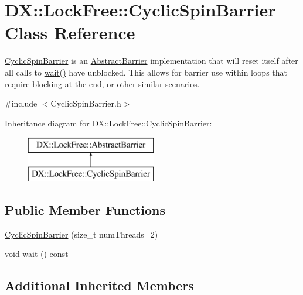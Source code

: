 \hypertarget{class_d_x_1_1_lock_free_1_1_cyclic_spin_barrier}{\section{D\-X\-:\-:Lock\-Free\-:\-:Cyclic\-Spin\-Barrier Class Reference}
\label{class_d_x_1_1_lock_free_1_1_cyclic_spin_barrier}
}


\hyperlink{class_d_x_1_1_lock_free_1_1_cyclic_spin_barrier}{Cyclic\-Spin\-Barrier} is an \hyperlink{class_d_x_1_1_lock_free_1_1_abstract_barrier}{Abstract\-Barrier} implementation that will reset itself after all calls to \hyperlink{class_d_x_1_1_lock_free_1_1_cyclic_spin_barrier_af9b42b0455c7251bda38694a2df17d11}{wait()} have unblocked. This allows for barrier use within loops that require blocking at the end, or other similar scenarios.  




{\ttfamily \#include $<$Cyclic\-Spin\-Barrier.\-h$>$}

Inheritance diagram for D\-X\-:\-:Lock\-Free\-:\-:Cyclic\-Spin\-Barrier\-:\begin{figure}[H]
\begin{center}
\leavevmode
\includegraphics[height=2.000000cm]{class_d_x_1_1_lock_free_1_1_cyclic_spin_barrier}
\end{center}
\end{figure}
\subsection*{Public Member Functions}
\begin{DoxyCompactItemize}
\item 
\hyperlink{class_d_x_1_1_lock_free_1_1_cyclic_spin_barrier_a857ff57e8576bee333452b0f3f3f1515}{Cyclic\-Spin\-Barrier} (size\-\_\-t num\-Threads=2)
\item 
void \hyperlink{class_d_x_1_1_lock_free_1_1_cyclic_spin_barrier_af9b42b0455c7251bda38694a2df17d11}{wait} () const 
\end{DoxyCompactItemize}
\subsection*{Additional Inherited Members}


